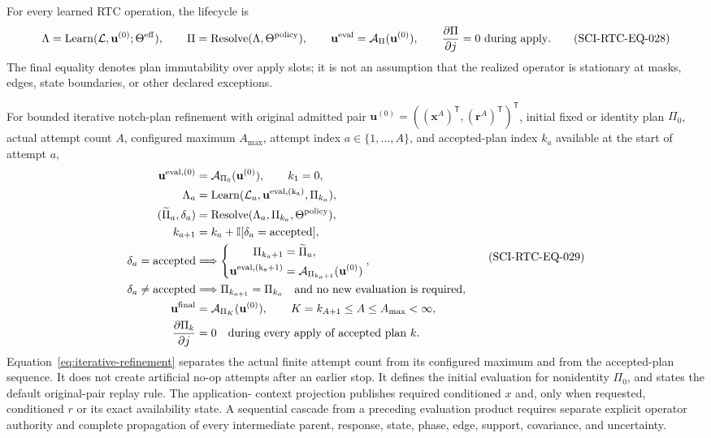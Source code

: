 For every learned RTC operation, the lifecycle is
\begin{equation}
 \Lambda=\operatorname{Learn}(\mathcal L,\mathbf u^{(0)};
                  \Theta^{\rm eff}),\qquad
 \Pi=\operatorname{Resolve}(\Lambda,\Theta^{\rm policy}),\qquad
 \mathbf u^{\rm eval}=\mathcal A_{\Pi}(\mathbf u^{(0)}),\qquad
 \frac{\partial\Pi}{\partial j}=0\ \text{during apply}.
 \tag{SCI-RTC-EQ-028}\label{eq:learn-resolve-apply}
\end{equation}
The final equality denotes plan immutability over apply slots; it is not an
assumption that the realized operator is stationary at masks, edges, state
boundaries, or other declared exceptions.

For bounded iterative notch-plan refinement with original admitted pair
$\mathbf u^{(0)}=((\mathbf x^A)^{\mathsf T},
(\mathbf r^A)^{\mathsf T})^{\mathsf T}$, initial fixed or identity plan
$\Pi_0$, actual attempt count $A$,
configured maximum $A_{\max}$, attempt index $a\in\{1,\ldots,A\}$, and
accepted-plan index $k_a$ available at the start of attempt $a$,
\begin{equation}
 \begin{aligned}
 \mathbf u^{\rm eval,(0)}&=\mathcal A_{\Pi_0}(\mathbf u^{(0)}),
 \qquad k_1=0,\\
 \Lambda_a&=\operatorname{Learn}(\mathcal L_a,
             \mathbf u^{\rm eval,(k_a)},\Pi_{k_a}),\\
 (\widetilde\Pi_a,\delta_a)&=\operatorname{Resolve}
             (\Lambda_a,\Pi_{k_a},\Theta^{\rm policy}),\\
 k_{a+1}&=k_a+\mathbb I[\delta_a=\mathrm{accepted}],\\
 \delta_a=\mathrm{accepted}&\Longrightarrow
 \left\{\begin{aligned}
 \Pi_{k_a+1}&=\widetilde\Pi_a,\\
 \mathbf u^{\rm eval,(k_a+1)}&=
             \mathcal A_{\Pi_{k_a+1}}(\mathbf u^{(0)})
 \end{aligned}\right.,\\
 \delta_a\ne\mathrm{accepted}&\Longrightarrow
 \Pi_{k_{a+1}}=\Pi_{k_a}\quad\text{and no new evaluation is required},\\
 \mathbf u^{\rm final}&=\mathcal A_{\Pi_K}(\mathbf u^{(0)}),\qquad
 K=k_{A+1}\le A\le A_{\max}<\infty,\\
 \frac{\partial\Pi_k}{\partial j}&=0
             \quad\text{during every apply of accepted plan }k.
 \end{aligned}
 \tag{SCI-RTC-EQ-029}\label{eq:iterative-refinement}
\end{equation}
Equation~\eqref{eq:iterative-refinement} separates the actual finite attempt
count from its configured maximum and from the accepted-plan sequence.  It
does not create artificial no-op attempts after an earlier stop.  It defines
the initial evaluation for nonidentity
$\Pi_0$, and states the default original-pair replay rule.  The application-
context projection publishes required conditioned $x$ and, only when
requested, conditioned $r$ or its exact availability state.  A sequential
cascade from a preceding evaluation product requires separate
explicit operator authority and complete propagation of every intermediate
parent, response, state, phase, edge, support, covariance, and uncertainty.

